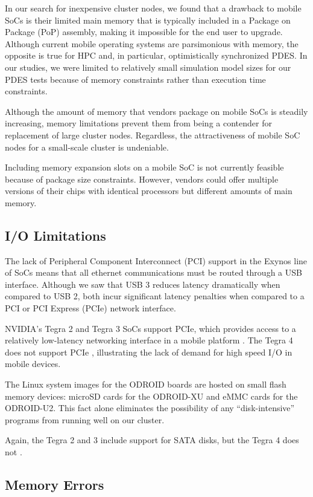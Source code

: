 \documentclass[11pt]{book}
\begin{document}
In our search for inexpensive cluster nodes, we found that a drawback to mobile
SoCs is their limited main memory that is typically included in a Package on
Package (PoP) assembly, making it impossible for the end user to
upgrade. Although current mobile operating systems are parsimonious with memory,
the opposite is true for HPC and, in particular, optimistically synchronized
PDES. In our studies, we were limited to relatively small simulation model sizes
for our PDES tests because of memory constraints rather than execution time
constraints.

Although the amount of memory that vendors package on mobile SoCs is steadily
increasing, memory limitations prevent them from being a contender for
replacement of large cluster nodes. Regardless, the attractiveness of mobile SoC
nodes for a small-scale cluster is undeniable.

Including memory expansion slots on a mobile SoC is not currently feasible
because of package size constraints. However, vendors could offer multiple
versions of their chips with identical processors but different amounts of main
memory.

\subsection{\textbf{I/O Limitations}}

The lack of Peripheral Component Interconnect (PCI) support in the Exynos line
of SoCs means that all ethernet communications must be routed through a USB
interface. Although we saw that USB 3 reduces latency dramatically when compared
to USB 2, both incur significant latency penalties when compared to a PCI or PCI
Express (PCIe) network interface.

NVIDIA's Tegra 2 and Tegra 3 SoCs support PCIe, which provides access to a
relatively low-latency networking interface in a mobile platform
\cite{rajovic-13}. The Tegra 4 does not support PCIe \cite{arstch-tegra},
illustrating the lack of demand for high speed I/O in mobile devices.

The Linux system images for the ODROID boards are hosted on small flash memory
devices: microSD cards for the ODROID-XU and eMMC cards for the ODROID-U2. This
fact alone eliminates the possibility of any ``disk-intensive'' programs from
running well on our cluster.

Again, the Tegra 2 and 3 include support for SATA disks, but the Tegra 4 does
not \cite{arstch-tegra}.

\subsection{\textbf{Memory Errors}}
\end{document}
